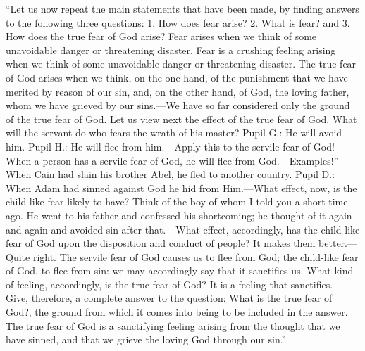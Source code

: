 “Let us now repeat the main statements that have been made, by finding answers to the following three questions: 1. How does fear arise? 2. What is fear? and 3. How does the true fear of God arise? Fear arises when we think of some unavoidable danger or threatening disaster. Fear is a crushing feeling arising when we think of some unavoidable danger or threatening disaster. The true fear of God arises when we think, on the one hand, of the punishment that we have merited by reason of our sin, and, on the other hand, of God, the loving father, whom we have grieved by our sins.—We have so far considered only the ground of the true fear of God. Let us view next the effect of the true fear of God. What will the servant do who fears the wrath of his master? Pupil G.: He will avoid him. Pupil H.: He will flee from him.—Apply this to the servile fear of God! When a person has a servile fear of God, he will flee from God.—Examples!”
When Cain had slain his brother Abel, he fled to another country. Pupil D.: When Adam had sinned against God he hid from Him.—What effect, now, is the child-like fear likely to have? Think of the boy of whom I told you a short time ago. He went to his father and confessed his shortcoming; he thought of it again and again and avoided sin after that.—What effect, accordingly, has the child-like fear of God upon the disposition and conduct of people? It makes them better.—Quite right. The servile fear of God causes us to flee from God; the child-like fear of God, to flee from sin: we may accordingly say that it sanctifies us. What kind of feeling, accordingly, is the true fear of God? It is a feeling that sanctifies.—Give, therefore, a complete answer to the question: What is the true fear of God?, the ground from which it comes into being to be included in the answer. The true fear of God is a sanctifying feeling arising from the thought that we have sinned, and that we grieve the loving God through our sin.”

